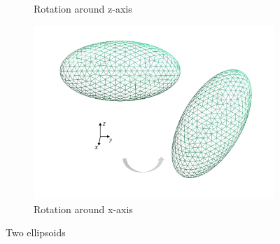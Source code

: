 \begin{figure}[H]
\begin{subfigure}{.5\linewidth}
    \caption{Rotation around z-axis}
    \end{subfigure}%
    \begin{subfigure}{.5\linewidth}
    \centering
    \includegraphics[scale = 0.4]{figures/Ellipsoid_x_axis}
    \caption{Rotation around x-axis}
    \end{subfigure}
    \caption{Two ellipsoids}
    \end{figure}


